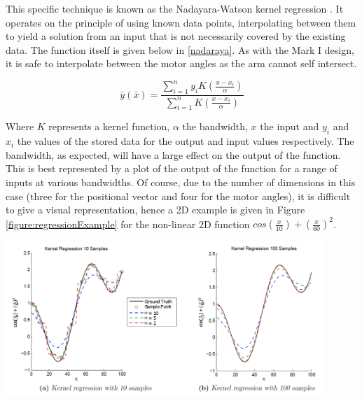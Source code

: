 \documentclass[11pt]{article}
\begin{document}
This specific technique is known as the Nadayara-Watson kernel regression \cite{nadaraya1964}. It operates on the principle of using known data points, interpolating between them to yield a solution from an input that is not necessarily covered by the existing data. The function itself is given below in \eqref{nadaraya}. As with the Mark I design, it is safe to interpolate between the motor angles as the arm cannot self intersect.

\begin{equation}\label{nadaraya}
\bar{y}(\bar{x}) = \frac{\sum_{i=1}^{n}y_{i}K(\frac{x - x_{i}}{\alpha})}{\sum_{i=1}^{n}K(\frac{x - x_{i}}{\alpha})}
\end{equation}

Where $K$ represents a kernel function, $\alpha$ the bandwidth, $x$ the input and $y_{i}$ and $x_{i}$ the values of the stored data for the output and input values respectively. The bandwidth, as expected, will have a large effect on the output of the function. This is best represented by a plot of the output of the function for a range of inputs at various bandwidths. Of course, due to the number of dimensions in this case (three for the positional vector and four for the motor angles), it is difficult to give a visual representation, hence a 2D example is given in Figure \ref{figure:regressionExample} for the non-linear 2D function $cos(\frac{x}{10}) + (\frac{x}{60})^2$. 

\begin{center}
\includegraphics[width=0.9\textwidth]{images/regressionExample.png}
\label{figure:regressionExample}
\end{center}
\end{document}
